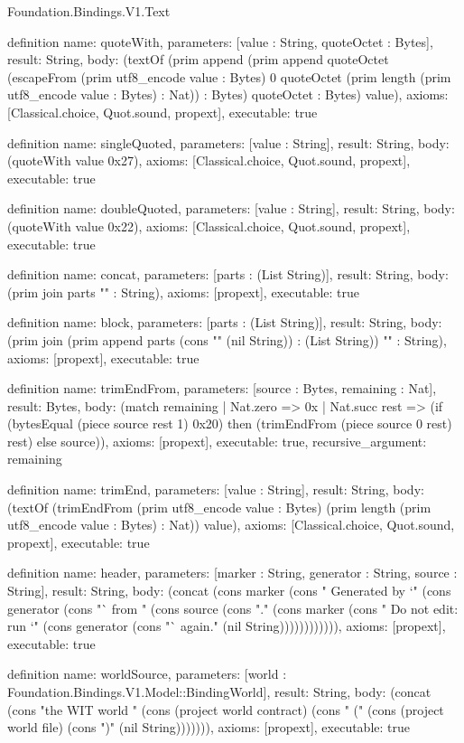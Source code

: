 \begin{lexlean}{Foundation.Bindings.V1.Text}
\begin{semanticmodule}
definition{
  name: quoteWith,
  parameters: [value : String, quoteOctet : Bytes],
  result: String,
  body: (textOf (prim append (prim append quoteOctet (escapeFrom (prim utf8_encode value : Bytes) 0 quoteOctet (prim length (prim utf8_encode value : Bytes) : Nat)) : Bytes) quoteOctet : Bytes) value),
  axioms: [Classical.choice, Quot.sound, propext],
  executable: true
}

definition{
  name: singleQuoted,
  parameters: [value : String],
  result: String,
  body: (quoteWith value 0x27),
  axioms: [Classical.choice, Quot.sound, propext],
  executable: true
}

definition{
  name: doubleQuoted,
  parameters: [value : String],
  result: String,
  body: (quoteWith value 0x22),
  axioms: [Classical.choice, Quot.sound, propext],
  executable: true
}

definition{
  name: concat,
  parameters: [parts : (List String)],
  result: String,
  body: (prim join parts "" : String),
  axioms: [propext],
  executable: true
}

definition{
  name: block,
  parameters: [parts : (List String)],
  result: String,
  body: (prim join (prim append parts (cons "" (nil String)) : (List String)) "\n" : String),
  axioms: [propext],
  executable: true
}

definition{
  name: trimEndFrom,
  parameters: [source : Bytes, remaining : Nat],
  result: Bytes,
  body: (match remaining
    | Nat.zero => 0x
    | Nat.succ rest => (if (bytesEqual (piece source rest 1) 0x20) then (trimEndFrom (piece source 0 rest) rest) else source)),
  axioms: [propext],
  executable: true,
  recursive_argument: remaining
}

definition{
  name: trimEnd,
  parameters: [value : String],
  result: String,
  body: (textOf (trimEndFrom (prim utf8_encode value : Bytes) (prim length (prim utf8_encode value : Bytes) : Nat)) value),
  axioms: [Classical.choice, Quot.sound, propext],
  executable: true
}

definition{
  name: header,
  parameters: [marker : String, generator : String, source : String],
  result: String,
  body: (concat (cons marker (cons " Generated by `" (cons generator (cons "` from " (cons source (cons ".\n" (cons marker (cons " Do not edit: run `" (cons generator (cons "` again.\n" (nil String)))))))))))),
  axioms: [propext],
  executable: true
}

definition{
  name: worldSource,
  parameters: [world : Foundation.Bindings.V1.Model::BindingWorld],
  result: String,
  body: (concat (cons "the WIT world " (cons (project world contract) (cons " (" (cons (project world file) (cons ")" (nil String))))))),
  axioms: [propext],
  executable: true
}


\end{semanticmodule}
\end{lexlean}
